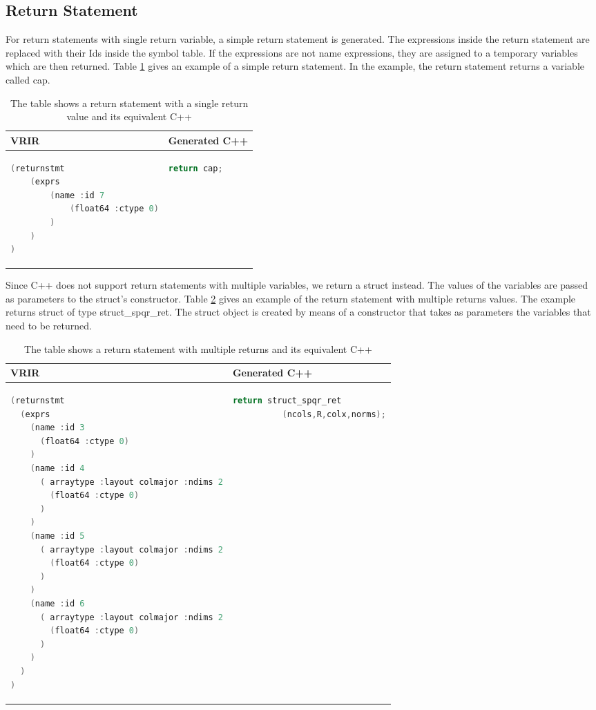 \subsection{Return Statement}
For return statements with single return variable, a simple return statement is generated. The expressions inside the return statement are replaced with their Ids inside the symbol table. If the expressions are not name expressions, they are assigned to a temporary variables which are then returned. Table \ref{tab:simpleReturn} gives an example of a simple return statement. In the example, the return statement returns a variable called \textsf{cap}. 
\begin{table}[htbp]
\centering
\begin{tabular}{|l|l|}
\hline

VRIR &  Generated C++ \\
\hline
{
\begin{lstlisting}[language=c,frame=none, numbers=none]
(returnstmt
	(exprs
		(name :id 7
			(float64 :ctype 0)
		)
	)
)
\end{lstlisting}
}
&
{
\begin{lstlisting}[language=c,frame=none, numbers=none]
return cap;
\end{lstlisting}
} \\
\hline
\end{tabular}
\caption[Simple return statement]{The table shows a return statement with a single return value and its equivalent C++}
\label{tab:simpleReturn}
\end{table}
Since C++ does not support return statements with multiple variables, we return a struct instead. The values of the variables are passed as parameters to the struct's constructor. Table \ref{tab:multiReturn} gives an example of the return statement with multiple returns values. The example returns struct of type struct\_spqr\_ret. The struct object is created by means of a constructor that takes as parameters the variables that need to be returned. 
\begin{table}[htbp]
\centering
\begin{tabular}{|l|l|}
\hline

VRIR &  Generated C++ \\
\hline
{
\begin{lstlisting}[language=c,frame=none, numbers=none]
(returnstmt
  (exprs
    (name :id 3
      (float64 :ctype 0)
    )
    (name :id 4
      ( arraytype :layout colmajor :ndims 2
        (float64 :ctype 0)
      )
    )
    (name :id 5
      ( arraytype :layout colmajor :ndims 2
        (float64 :ctype 0)
      )
    )
    (name :id 6
      ( arraytype :layout colmajor :ndims 2
        (float64 :ctype 0)
      )
    )
  )
)
\end{lstlisting}
}
&
{
\begin{lstlisting}[language=c,frame=none, numbers=none]
return struct_spqr_ret
          (ncols,R,colx,norms);
\end{lstlisting}
} \\
\hline
\end{tabular}
\caption[Multiple return statement]{The table shows a return statement with multiple returns and its equivalent C++}
\label{tab:multiReturn}
\end{table}

